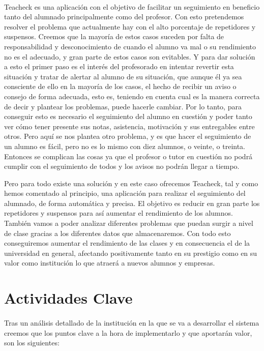 \paragraph{}
Teacheck es una aplicación con el objetivo de facilitar un seguimiento en beneficio tanto del alumnado principalmente como del profesor. Con esto pretendemos resolver el problema que actualmente hay con el alto porcentaje de repetidores y suspensos. Creemos que la mayoría de estos casos suceden por falta de responsabilidad y desconocimiento de cuando el alumno va mal o su rendimiento no es el adecuado, y gran parte de estos casos son evitables. Y para dar solución a esto el primer paso es el interés del profesorado en intentar revertir esta situación y tratar de alertar al alumno de su situación, que aunque él ya sea consciente de ello en la mayoría de los casos, el hecho de recibir un aviso o consejo de forma adecuada, esto es, teniendo en cuenta cual es la manera correcta de decir y plantear los problemas, puede hacerle cambiar. Por lo tanto, para conseguir esto es necesario el seguimiento del alumno en cuestión y poder tanto ver cómo tener presente sus notas, asistencia, motivación y sus entregables entre otros. Pero aquí se nos plantea otro problema, y es que hacer el seguimiento de un alumno es fácil, pero no es lo mismo con diez alumnos, o veinte, o treinta. Entonces se complican las cosas ya que el profesor o tutor en cuestión no podrá cumplir con el seguimiento de todos y los avisos no podrán llegar a tiempo. 

Pero para todo existe una solución y en este caso ofrecemos Teacheck, tal y como hemos comentado al principio, una aplicación para realizar el seguimiento del alumnado, de forma automática y precisa. El objetivo es reducir en gran parte los repetidores y suspensos para así aumentar el rendimiento de los alumnos. También vamos a poder analizar diferentes problemas que puedan surgir a nivel de clase gracias a los diferentes datos que almacenaremos. Con todo esto conseguiremos aumentar el rendimiento de las clases y en consecuencia el de la universidad en general, afectando positivamente tanto en su prestigio como en su valor como institución lo que atraerá a nuevos alumnos y empresas.

\section{Actividades Clave}

\paragraph{}
Tras un análisis detallado de la institución en la que se va a desarrollar el sistema creemos que los puntos clave a la hora de implementarlo y que aportarán valor, son los siguientes:  
 
